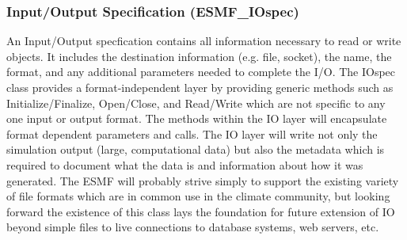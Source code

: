 \subsubsection{Input/Output Specification (ESMF\_IOspec)}
\label{sec:iospec} 
An Input/Output specfication contains all 
information necessary to read or write objects.  It includes the 
destination information (e.g. file, socket), the name,
the format, and any additional parameters needed to complete the I/O.
The IOspec class provides a format-independent layer by
providing generic methods such as Initialize/Finalize, Open/Close, 
and Read/Write which are not specific to any one input or output format.
The methods
within the IO layer will encapsulate format dependent parameters and calls.
The IO layer will write not only the simulation output (large, computational
data) but also the metadata which is required to document what the data is
and information about how it was generated.
The ESMF will probably strive simply to
support the existing variety of file formats which are in common use in
the climate community, but looking forward
the existence of this class lays the foundation for future extension 
of IO beyond simple files to live connections to database systems, 
web servers, etc.





